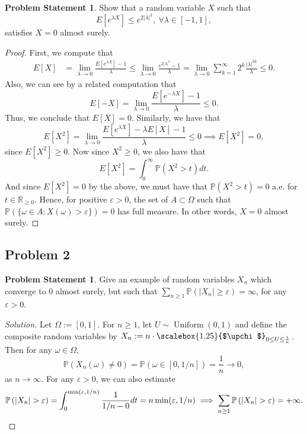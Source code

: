 \documentclass[12pt,reqno]{article}
\theoremstyle{plain}
\theoremstyle{definition}
\newtheorem{problem}[theorem]{Problem Statement}
\newcommand{\PP}[1]{\ensuremath{\mathbb{P}\left(#1\right)}}
\renewcommand{\chi}{\scalebox{1.25}{$\upchi$}}
\begin{document}
\begin{problem}
Show that a random variable $X$ such that 
\[
E[e^{\lambda X}] \leq e^{2|\lambda|^3},\ \forall \lambda \in [-1, 1], 
\]
satisfies $X = 0$ almost surely. 
\end{problem}
\begin{proof} 
First, we compute that 
\begin{align*} 
E[X] & = \lim_{\lambda \rightarrow 0} \frac{E[e^{\lambda X}] - 1}{\lambda} 
     \leq \lim_{\lambda \rightarrow 0} \frac{e^{2|\lambda|^3} - 1}{\lambda} 
     = \lim_{\lambda \rightarrow 0} \sum_{k=1}^{\infty} 
     2^k \frac{|\lambda|^{3k}}{\lambda} 
     \leq 0. 
\end{align*} 
Also, we can see by a related computation that 
\[
E[-X] = \lim_{\lambda \rightarrow 0} \frac{E[e^{-\lambda X}] - 1}{\lambda}
     \leq 0. 
\]
Thus, we conclude that $E[X] = 0$. 
Similarly, we have that 
\[
E[X^2] = \lim_{\lambda \rightarrow 0} \frac{E[e^{\lambda X}] - \lambda E[X] -1}{
     \lambda} \leq 0 \implies E[X^2] = 0, 
\]
since $E[X^2] \geq 0$. Now since $X^2 \geq 0$, we also have that 
\[
E[X^2] = \int_0^{\infty} \PP{X^2 > t} dt. 
\]
And since $E[X^2] = 0$ by the above, we must have that $\PP{X^2 > t} = 0$ a.e. 
for $t \in \mathbb{R}_{\geq 0}$. Hence, for positive $\varepsilon > 0$, 
the set of $A \subset \Omega$ such that 
$\PP{\{\omega \in A: X(\omega) > \varepsilon\}} = 0$ has full measure. 
In other words, $X = 0$ almost surely. 
\end{proof} 

\subsection{Problem 2}

\begin{problem}
Give an example of random variables $X_n$ which converge to $0$ almost 
surely, but such that $\sum_{n \geq 1} \PP{|X_n| \geq \varepsilon} = \infty$, 
for any $\varepsilon > 0$. 
\end{problem}
\begin{proof}[Solution] 
Let $\Omega := [0, 1]$. 
For $n \geq 1$, let $U \sim \operatorname{Uniform}(0,1)$ and 
define the composite random variables by 
$X_n := n \cdot \chi_{0 \leq U \leq \frac{1}{n}}$. Then for any 
$\omega \in \Omega$, 
\[
\PP{X_n(\omega) \neq 0} = \PP{\omega \in [0, 1/n]} = \frac{1}{n} 
     \longrightarrow 0, 
\]
as $n \rightarrow \infty$. For any $\varepsilon > 0$, we can also estimate 
\[
\PP{|X_n| > \varepsilon} = 
     \int_0^{\min(\varepsilon, 1/n)} \frac{1}{1/n-0} dt = 
     n \min(\varepsilon, 1/n) \implies 
     \sum_{n \geq 1} \PP{|X_n| > \varepsilon} = +\infty. 
     \qedhere
\]
\end{proof} 
\end{document}
